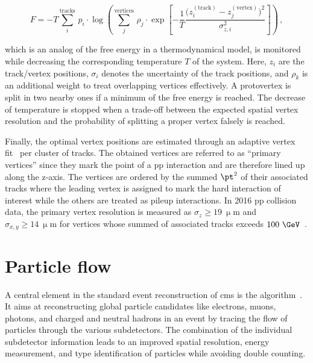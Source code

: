 \begin{equation}
F=-T\sum_{i}^\mathrm{tracks}\,p_{i}\cdot\log\left(\sum_{j}^\mathrm{vertices}\,\rho_{j}\cdot\exp\left[-\frac{1}{T}\frac{\Big(z_{i}^\mathrm{(track)}-z_{j}^\mathrm{(vertex)}\Big)^2}{\sigma_{z,i}^2}\right]\right)\,,
\end{equation}
 
which is an analog of the free energy in a thermodynamical model, is monitored while decreasing the corresponding temperature $T$ of the system. Here, $z_{i}$ are the track/vertex positions, $\sigma_{i}$ denotes the uncertainty of the track positions, and $\rho_{k}$ is an additional weight to treat overlapping vertices effectively. A protovertex is split in two nearby ones if a minimum of the free energy is reached. The decrease of temperature is stopped when a trade-off between the expected spatial vertex resolution and the probability of splitting a proper vertex falsely is reached.

Finally, the optimal vertex positions are estimated through an adaptive vertex fit~\cite{0954-3899-34-12-N01} per cluster of tracks. The obtained vertices are referred to as ``primary vertices'' since they mark the point of a \gls{pp} interaction and are therefore lined up along the z-axis. The vertices are ordered by the summed $\pt^2$ of their associated tracks where the leading vertex is assigned to mark the hard interaction of interest while the others are treated as pileup interactions. In 2016 \gls{pp} collision data, the primary vertex resolution is measured as $\sigma_{z}\geq19~\upmu\mathrm{m}$ and $\sigma_{x,y}\geq14~\upmu\mathrm{m}$ for vertices whose summed \pt of associated tracks exceeds $100~\GeV$~\cite{CMS-DP-2016-041}.



\section{Particle flow}

A central element in the standard event reconstruction of \gls{cms} is the  algorithm~\cite{CMS:2009nxa}. It aims at reconstructing global particle candidates like electrons, muons, photons, and charged and neutral hadrons in an event by tracing the flow of particles through the various subdetectors. The combination of the individual subdetector information leads to an improved spatial resolution, energy measurement, and type identification of particles while avoiding double counting.

